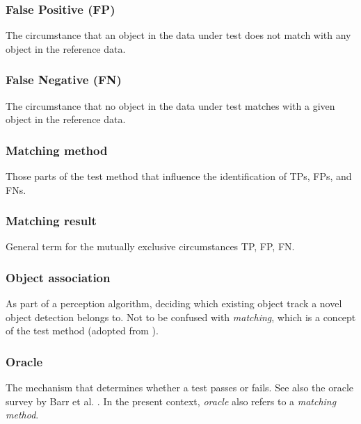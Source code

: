 \documentclass[conference]{IEEEtran}
\begin{document}
\subsubsection{False Positive (FP)} \label{def:fp} The circumstance that an object in the data under test does not match with any object in the reference data. 

\subsubsection{False Negative (FN)} \label{def:fn} The circumstance that no object in the data under test matches with a given object in the reference data.

\subsubsection{Matching method} \label{def:matching_method} Those parts of the test method that influence the identification of TPs, FPs, and FNs. %


\subsubsection{Matching result} \label{def:matching_result} General term for the mutually exclusive circumstances TP, FP, FN.  



\subsubsection{Object association} \label{def:association} As part of a perception algorithm, deciding which existing object track a novel object detection belongs to. Not to be confused with \textit{matching}, which is a concept of the test method (adopted from \cite{Luiten2020hota}).

\subsubsection{Oracle} \label{def:oracle} The mechanism that determines whether a test passes or fails. See also the oracle survey by Barr et al. \cite{Barr2015oracle}.
In the present context, \textit{oracle} also refers to a \textit{matching method}.
\end{document}
